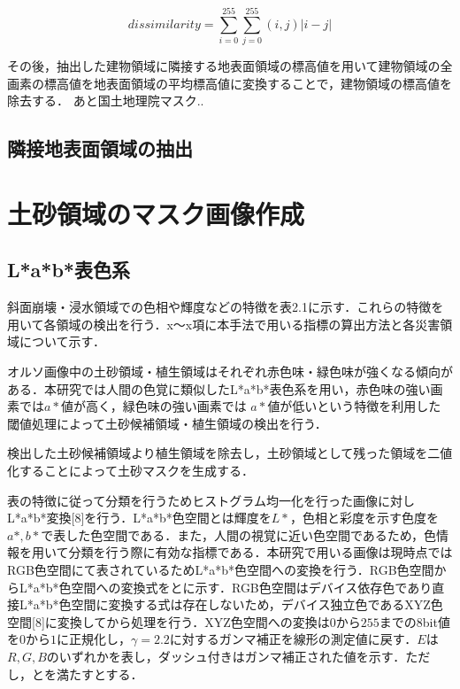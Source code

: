       \begin{equation}
        \label{異質度}
        dissimilarity = \sum_{i=0}^{255} \sum_{j=0}^{255} (i,j) |i-j|
      \end{equation}

      その後，抽出した建物領域に隣接する地表面領域の標高値を用いて建物領域の全画素の標高値を地表面領域の平均標高値に変換することで，建物領域の標高値を除去する．
      あと国土地理院マスク..

    \subsection{隣接地表面領域の抽出}

  
  \section{土砂領域のマスク画像作成}
    \label{土砂マスク}
    \subsection{L*a*b*表色系}
    斜面崩壊・浸水領域での色相や輝度などの特徴を表2.1に示す．これらの特徴を用いて各領域の検出を行う．x〜x項に本手法で用いる指標の算出方法と各災害領域について示す．

      オルソ画像中の土砂領域・植生領域はそれぞれ赤色味・緑色味が強くなる傾向がある．本研究では人間の色覚に類似したL*a*b*表色系を用い，赤色味の強い画素では$a*$値が高く，緑色味の強い画素では $a*$値が低いという特徴を利用した閾値処理によって土砂候補領域・植生領域の検出を行う．
      
      検出した土砂候補領域より植生領域を除去し，土砂領域として残った領域を二値化することによって土砂マスクを生成する．
  

      表\tref{}の特徴に従って分類を行うためヒストグラム均一化を行った画像に対しL*a*b*変換[8]を行う．L*a*b*色空間とは輝度を$L*$，色相と彩度を示す色度を$a*,b*$で表した色空間である．また，人間の視覚に近い色空間であるため，色情報を用いて分類を行う際に有効な指標である．本研究で用いる画像は現時点ではRGB色空間にて表されているためL*a*b*色空間への変換を行う．RGB色空間からL*a*b*色空間への変換式をとに示す．RGB色空間はデバイス依存色であり直接L*a*b*色空間に変換する式は存在しないため，デバイス独立色であるXYZ色空間[8]に変換してから処理を行う．XYZ色空間への変換は$0$から$255$までの8bit値を$0$から$1$に正規化し，$γ=2.2$に対するガンマ補正を線形の測定値に戻す．$E$は$R,G,B$のいずれかを表し，ダッシュ付きはガンマ補正された値を示す．ただし，とを満たすとする．

